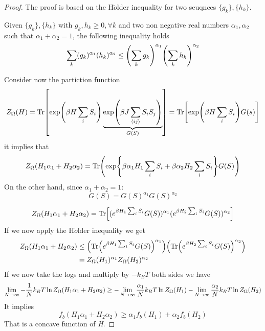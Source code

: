 \documentclass[../main/main.tex]{subfiles}
\begin{document}
\begin{proof}
The proof is based on the H$\ddot{o}$lder inequality for two seuqnces  \( \{ g_k \}, \{ h_k \}     \).
\begin{definition}
  Given  \( \{ g_k \}, \{ h_k \}     \) with \( g_k,h_k \ge 0, \forall k \) and two non negative real numbers \( \alpha _1, \alpha _2 \) such that \( \alpha _1 + \alpha _2 =1 \), the following inequality holds
  \begin{equation}
    \sum_{k}^{} (g_k)^{\alpha _1} (h_k)^{\alpha _2} \le \qty(\sum_{k}^{} g_k )^{\alpha _1} \qty(\sum_{k}^{} h_k )^{\alpha _2}
  \end{equation}
\end{definition}
Consider now the partiction function
\begin{equation}
  Z_ \Omega  (H) = \Tr[\exp (\beta H \sum_{i}^{} S_i ) \underbrace{\exp (\beta J \sum_{\expval{ij} }^{} S_i S_j ) }_{G (S)}  ] = \Tr [\exp (\beta H \sum_{i}^{} S_i ) G (s)]
\end{equation}
it implies that
\begin{equation}
  Z_ \Omega  (H_1 \alpha _1 + H_2 \alpha _2) = \Tr(\exp {\beta \alpha _1 H_1 \sum_{i}^{} S_i + \beta \alpha _2 H_2 \sum_{i}^{} S_i} G(S))
\end{equation}
On the other hand, since \( \alpha _1 + \alpha _2 =1 \):
\begin{equation}
  G (S) = G (S)^{\alpha _1} G(S)^{\alpha _2}
\end{equation}

\begin{equation}
    Z_ \Omega  (H_1 \alpha _1 + H_2 \alpha _2)   = \Tr[ (e^{\beta H_1 \sum_{i}^{} S_i } G (S))^{\alpha _1} (e^{\beta H_2 \sum_{i}^{} S_i } G (S))^{\alpha _2}]
\end{equation}
If we now apply the H$\ddot{o}$lder inequality we get
\begin{equation}
\begin{split}
    Z_ \Omega  (H_1 \alpha _1 + H_2 \alpha _2) & \le \qty(\Tr (e^{\beta H_1 \sum_{i}^{} S_i } G(S))^{\alpha _1}  ) \qty(\Tr (e^{\beta H_2 \sum_{i}^{} S_i } G (S))^{\alpha _2}  ) \\
    & = Z_ \Omega (H_1)^{\alpha _1} Z_ \Omega (H_2)^{\alpha _2}
\end{split}
\end{equation}
If we now take the logs and multiply by \( -k_B T \) both sides we have
\begin{equation}
  \lim_{N \rightarrow \infty } - \frac{1}{N} k_B T \ln{Z_ \Omega (H_1 \alpha _1 + H_2 \alpha _2)}  \ge
   - \lim_{N \rightarrow \infty } \frac{\alpha _1}{N} k_B T \ln{Z_ \Omega  (H_1 )} -
    \lim_{N \rightarrow \infty } \frac{\alpha _2}{N} k_B T \ln{Z_ \Omega  (H_2 )}  \\
\end{equation}
It implies
\begin{equation}
  f_b (H_1 \alpha _1 + H_2 \alpha _2) \ge \alpha _1 f_b (H_1 ) +  \alpha _2 f_b (H_2)
\end{equation}
That is a concave function of \emph{H}.
\end{proof}
\end{document}
